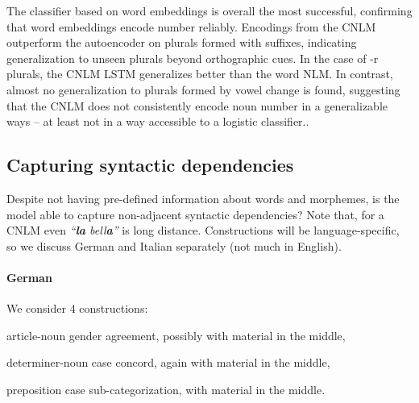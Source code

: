 The classifier based on word embeddings is overall the most successful, confirming that word embeddings encode number reliably.
Encodings from the CNLM outperform the autoencoder on plurals formed with suffixes, indicating generalization to unseen plurals beyond orthographic cues.
In the case of -r plurals, the CNLM LSTM generalizes better than the word NLM.
In contrast, almost no generalization to plurals formed by vowel change is found, suggesting that the CNLM does not consistently encode noun number in a generalizable ways -- at least not in a way accessible to a logistic classifier..


\subsection{Capturing syntactic dependencies}
\label{sec:dependencies}

Despite not having pre-defined information about words and morphemes,
is the model able to capture non-adjacent syntactic dependencies?
Note that, for a CNLM even \emph{``\textbf{la} bell\textbf{a}''} is long
distance.
Constructions will be language-specific, so we discuss
German and Italian separately (not much in English).


\paragraph{German} We consider 4 constructions:
\begin{inparaenum}[i)]
\item article-noun gender agreement, possibly with material in the middle,
\item determiner-noun case concord, again with material in the middle,
\item preposition case sub-categorization, with material in the middle.
\end{inparaenum}


